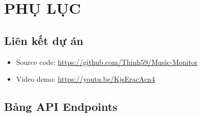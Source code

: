 \documentclass[12pt,a4paper]{report}
\begin{document}
\appendix
\renewcommand{\appendixname}{Phụ lục}

\chapter{PHỤ LỤC}

\section{Liên kết dự án}
\begin{itemize}
    \item Source code: \href{https://github.com/Thinh59/Music-Monitor}{https://github.com/Thinh59/Music-Monitor}
    \item Video demo: \href{https://youtu.be/KjsEracAcn4?si=pUIJTtgdBZ43e7jL}{https://youtu.be/KjsEracAcn4}

\end{itemize}

\section{Bảng API Endpoints}
\end{document}
